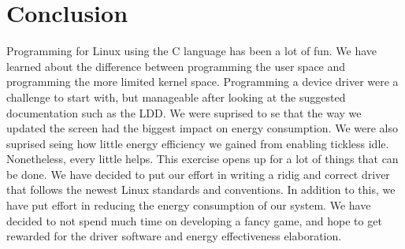 \section{Conclusion}
Programming for Linux using the C language has been a lot of fun. We have learned about the difference between programming the user space and programming the more limited kernel space. Programming a device driver were a challenge to start with, but manageable after looking at the suggested documentation such as the LDD. We were suprised to se that the way we updated the screen had the biggest impact on energy consumption. We were also suprised seing how little energy efficiency we gained from enabling tickless idle. Nonetheless, every little helps. 
This exercise opens up for a lot of things that can be done. We have decided to put our effort in writing a ridig and correct driver that follows the newest Linux standards and conventions. In addition to this, we have put effort in reducing the energy consumption of our system. We have decided to not spend much time on developing a fancy game, and hope to get rewarded for the driver software and energy effectiveness elaboration.
